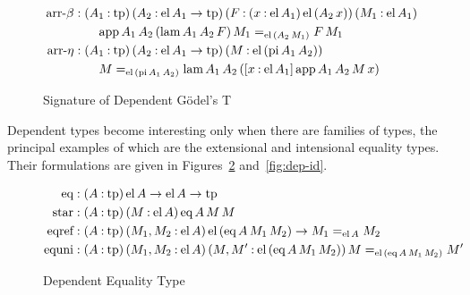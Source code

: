 \documentclass[11pt,twoside]{article}
\newcommand{\parens}[1]{(#1)}
\newcommand{\const}[1]{\text{#1}}
\newcommand{\eqclass}[3]{{#2}=_{#1}{#3}}
\newcommand{\piclass}[3]{({#2}\mathbin{:}{#1})\,{#3}}
\newcommand{\arrclass}[2]{{#1}\to{#2}}
\newcommand{\lamobj}[3]{[{#2}\mathbin{:}{#1}]\,{#3}}
\newcommand{\appobj}[2]{{#1}\,{#2}}
\begin{document}
\begin{figure}
\begin{align*}
%
    \betacon
    & :
      \piclass{\tpsort}{A_{1}}{
      \piclass{\arrclass{\elof{A_{1}}}{\tpsort}}{A_{2}}{
      \piclass{\piclass{\elof{A_{1}}}{x}{\elofp{\appobj{A_{2}}{x}}}}{F}{
      \piclass{\elof{A_{1}}}{M_{1}}{
      }}}} \\
    & \qquad
      \eqclass{\elofp{\appobj{A_{2}}{M_{1}}}}
      {\appof{A_{1}}{A_{2}}{\parens{\lamof{A_{1}}{A_{2}}{F}}}{M_{1}}}
      {\appobj{F}{M_{1}}} \\
    \etacon
    & :
      \piclass{\tpsort}{A_{1}}{
      \piclass{\arrclass{\elof{A_{1}}}{\tpsort}}{A_{2}}{
      \piclass{\elofp{\piof{A_{1}}{A_{2}}}}{M}{
      }}} \\
    & \qquad
      \eqclass{\elofp{\piof{A_{1}}{A_{2}}}}
      {M}
      {\lamof{A_{1}}{A_{2}}{\parens{\lamobj{\elof{A_{1}}}{x}{\appof{A_{1}}{A_{2}}{M}{x}}}}}
  \end{align*}

  \caption{Signature of Dependent G\"odel's T}
  \label{fig:t-sig-dep}
\end{figure}

Dependent types become interesting only when there are families of types, the principal
examples of which are the extensional and intensional equality types.  Their formulations
are given in Figures~\ref{fig:dep-eq} and~\ref{fig:dep-id}.

\newcommand{\eqcon}{\const{eq}}
\newcommand{\eqof}[3]{\appobj{\appobj{\appobj{\eqcon}{#1}}{#2}}{#3}}
\newcommand{\selfcon}{\const{star}}
\newcommand{\selfof}{\selfcon}
\newcommand{\eqrefcon}{\const{eqref}}
\newcommand{\equnicon}{\const{equni}}

\begin{figure}
  
  \begin{align*}
    \eqcon & : \piclass{\tpsort}{A}{\arrclass{\elof{A}}{\arrclass{\elof{A}}{\tpsort}}} \\
    \selfcon & : \piclass{\tpsort}{A}{\piclass{\elof{A}}{M}{\eqof{A}{M}{M}}} \\
    \eqrefcon  & :
         \piclass{\tpsort}{A}{\piclass{\elof{A}}{M_{1},M_{2}}{\arrclass{\elofp{\eqof{A}{M_{1}}{M_{2}}}}{\eqclass{\elof{A}}{M_{1}}{M_{2}}}}}  \\
    \equnicon & :
          \piclass{\tpsort}{A}{\piclass{\elof{A}}{M_{1},M_{2}}{\piclass{\elofp{\eqof{A}{M_{1}}{M_{2}}}}{M,M'}{\eqclass{\elofp{\eqof{A}{M_{1}}{M_{2}}}}{M}{M'}}}}
  \end{align*}

  \caption{Dependent Equality Type}
  \label{fig:dep-eq}
\end{figure}
\end{document}
